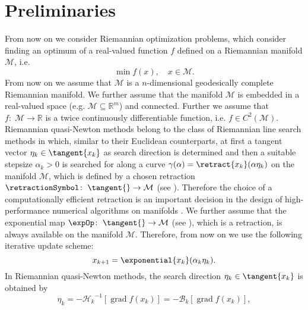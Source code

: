 \section{Preliminaries}


From now on we consider Riemannian optimization problems, which consider finding an optimum of a real-valued function $f$ defined on a Riemannian manifold $\mathcal{M}$, i.e.
\begin{equation*}
    \min f(x), \quad x \in \mathcal{M}.
\end{equation*}
From now on we assume that $\mathcal{M}$ is a $n$-dimensional geodesically complete Riemannian manifold. We further assume that the manifold $\mathcal{M}$ is embedded in a real-valued space (e.g. $\mathcal{M} \subseteq \mathbb{R}^m$) and connected. Further we assume that $f \colon \; \mathcal{M} \to \mathbb{R}$ is a twice continuously differentiable function, i.e. $f \in C^2(\mathcal{M})$. \\
Riemannian quasi-Newton methods belong to the class of Riemannian line search methods in which, similar to their Euclidean counterparts, at first a tangent vector $\eta_k \in \tangent{x_k}$ as search direction is determined and then a suitable stepsize $\alpha_k > 0$ is searched for along a curve $\gamma(\alpha) = \retract{x_k}(\alpha \eta_k)$ on the manifold $\mathcal{M}$, which is defined by a chosen retraction $\retractionSymbol \colon \; \tangent{} \to \mathcal{M}$ (see \cite[Definition~4.1.1]{AbsilMahonySepulchre:2008}). Therefore the choice of a computationally efficient retraction is an important decision in the design of high-performance numerical algorithms on manifolds \cite[p.~54]{AbsilMahonySepulchre:2008}. We further assume that the exponential map $\expOp \colon \; \tangent{} \to \mathcal{M}$ (see \cite[p.~102-103]{AbsilMahonySepulchre:2008}), which is a retraction, is always available on the manifold $\mathcal{M}$. Therefore, from now on we use the following iterative update scheme:
\begin{equation*}
    x_{k+1} = \exponential{x_k}(\alpha_k \eta_k).
\end{equation*}
In Riemannian quasi-Newton methods, the search direction $\eta_k \in \tangent{x_k}$ is obtained by 
\begin{equation*}
    \eta_k = -{\mathcal{H}_k}^{-1}[\operatorname{grad} f(x_k)] = -\mathcal{B}_k [\operatorname{grad} f(x_k)],
\end{equation*}
